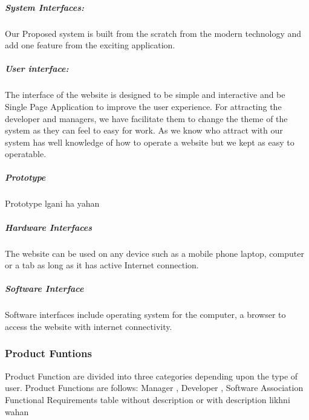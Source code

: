     \subparagraph{System Interfaces:}
    Our Proposed system is built from the scratch from the modern technology and add one feature from the exciting application. 
    \subparagraph{User interface: }
    The interface of the website is designed to be simple and interactive and be Single Page Application to improve the user experience. 
    For attracting the developer and managers, we have facilitate them to change the theme of the system as they can feel to easy for work.
    As we know who attract with our system has well knowledge of how to operate a website but we kept as easy to operatable.
    \subparagraph{Prototype}
    {\huge Prototype lgani ha yahan}
    \subparagraph{Hardware Interfaces}
    The website can be used on any device such as a mobile phone laptop, computer or a tab as long as it has active Internet connection.
    \subparagraph{Software Interface}
    Software interfaces include operating system for the computer, a browser to access the website with internet connectivity.
    \subsubsection{Product Funtions}
    Product Function are divided into three categories depending upon the type of user. Product Functions are follows:
    Manager , Developer , Software Association
    \\{\huge Functional Requirements table without description  or with description likhni wahan  \\ }
